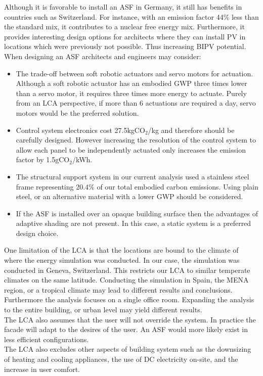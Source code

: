 Although it is favorable to install an ASF in Germany, it still has benefits in countries such as Switzerland. For instance, with an emission factor 44\% less than the standard mix, it contributes to a nuclear free energy mix. Furthermore, it provides interesting design options for architects where they can install PV in locations which were previously not possible. Thus increasing BIPV potential.  \\

When designing an ASF architects and engineers may consider: 
\begin{itemize}
\item The trade-off between soft robotic actuators and servo motors for actuation. Although a soft robotic actuator has an embodied GWP three times lower than a servo motor, it requires three times more energy to actuate. Purely from an LCA perspective, if more than 6 actuations are required a day, servo motors would be the preferred solution. 
\item Control system electronics cost 27.5kgCO${_2}$/kg and therefore should be carefully designed. However increasing the resolution of the control system to allow each panel to be independently actuated only increases the emission factor by 1.5gCO${_2}$/kWh.
\item The structural support system in our current analysis used a stainless steel frame representing 20.4\% of our total embodied carbon emissions. Using plain steel, or an alternative material with a lower GWP should be considered.
\item If the ASF is installed over an opaque building surface then the advantages of adaptive shading are not present. In this case, a static system is a preferred design choice. 
\end{itemize}

One limitation of the LCA is that the locations are bound to the climate of where the energy simulation was conducted. In our case, the simulation was conducted in Geneva, Switzerland. This restricts our LCA to similar temperate climates on the same latitude. Conducting the simulation in Spain, the MENA region, or a tropical climate may lead to different results and conclusions. Furthermore the analysis focuses on a single office room. Expanding the analysis to the entire building, or urban level may yield different results.\\
The LCA also assumes that the user will not override the system. In practice the facade will adapt to the desires of the user. An ASF would more likely exist in less efficient configurations. \\
The LCA also excludes other aspects of building system such as the downsizing of heating and cooling appliances, the use of DC electricity on-site, and the increase in user comfort. 


